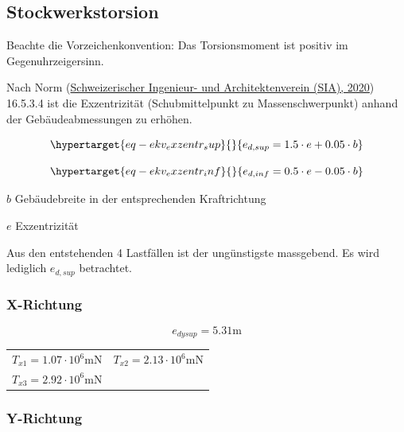 \documentclass[
  letterpaper,
  DIV=11]{scrreprt}
\begin{document}
\hypertarget{stockwerkstorsion}{%
\subsection{Stockwerkstorsion}\label{stockwerkstorsion}}

Beachte die Vorzeichenkonvention: Das Torsionsmoment ist positiv im
Gegenuhrzeigersinn.

Nach Norm (\protect\hyperlink{ref-SIA261_2020}{Schweizerischer
Ingenieur- und Architektenverein (SIA), 2020}) 16.5.3.4 ist die
Exzentrizität (Schubmittelpunkt zu Massenschwerpunkt) anhand der
Gebäudeabmessungen zu erhöhen.

\begin{equation}\protect\hypertarget{eq-ekv_exzentr_sup}{}{
e_{d,sup} = 1.5\cdot e+0.05\cdot b
}\label{eq-ekv_exzentr_sup}\end{equation}

\begin{equation}\protect\hypertarget{eq-ekv_exzentr_inf}{}{
e_{d,inf} = 0.5\cdot e-0.05\cdot b
}\label{eq-ekv_exzentr_inf}\end{equation}

\(b\) Gebäudebreite in der entsprechenden Kraftrichtung

\(e\) Exzentrizität

Aus den entstehenden 4 Lastfällen ist der ungünstigste massgebend. Es
wird lediglich \(e_{d,sup}\) betrachtet.

\hypertarget{x-richtung-7}{%
\subsubsection{X-Richtung}\label{x-richtung-7}}

\begin{equation}e_{dysup} = 5.31 \text{m}\end{equation}

\begin{longtable}[]{@{}
  >{\raggedright\arraybackslash}p{}
  >{\raggedright\arraybackslash}p{}@{}}
\toprule\noalign{}
\endhead
\bottomrule\noalign{}
\endlastfoot
\(T_{x1} = 1.07 \cdot 10^{6} \text{m} \text{N}\) &
\(T_{x2} = 2.13 \cdot 10^{6} \text{m} \text{N}\) \\
\(T_{x3} = 2.92 \cdot 10^{6} \text{m} \text{N}\) & \\
\end{longtable}

\hypertarget{y-richtung-7}{%
\subsubsection{Y-Richtung}\label{y-richtung-7}}
\end{document}
